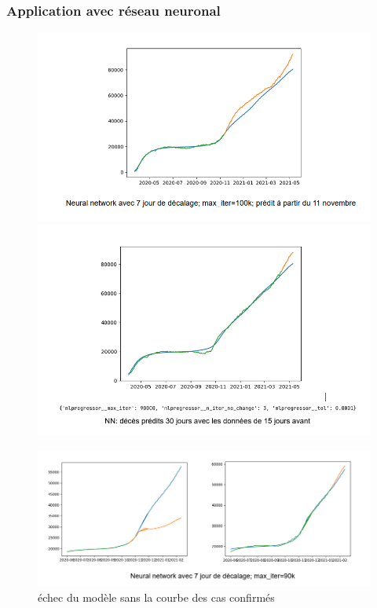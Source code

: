 \documentclass{beamer}[aspectratio = 43]
\begin{document}
\begin{frame}
	\frametitle{Application avec réseau neuronal}
	\begin{figure}[h]
		\centering
		\begin{minipage}{0.5\textwidth}
			\includegraphics[scale=0.37]{NN_1}
			\centering
		\end{minipage}%
		\begin{minipage}{0.5\textwidth}
			\includegraphics[scale=0.37]{NN_2}
			\centering
		\end{minipage}
	\end{figure}
	\begin{figure}
		\includegraphics[scale=0.4]{NN_3}
		\caption{échec du modèle sans la courbe des cas confirmés}
	\end{figure}
\end{frame}
\end{document}
